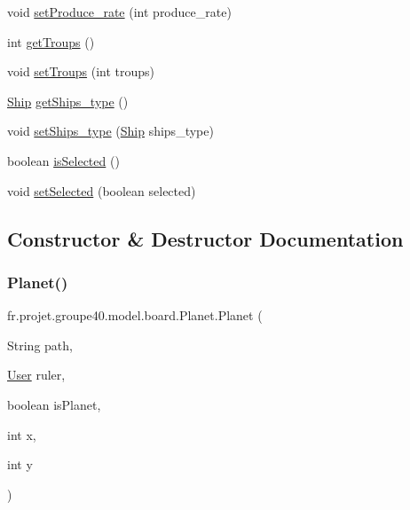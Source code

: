 \begin{DoxyCompactItemize}
\item 
void \hyperlink{classfr_1_1projet_1_1groupe40_1_1model_1_1board_1_1_planet_a6b556f628701ec94887fbe856bc3b609}{set\+Produce\+\_\+rate} (int produce\+\_\+rate)
\item 
int \hyperlink{classfr_1_1projet_1_1groupe40_1_1model_1_1board_1_1_planet_a0f02d5be191e9d4390b6fe128197242a}{get\+Troups} ()
\item 
void \hyperlink{classfr_1_1projet_1_1groupe40_1_1model_1_1board_1_1_planet_a2412d66ee3f606d0fce1a54e7675782e}{set\+Troups} (int troups)
\item 
\hyperlink{classfr_1_1projet_1_1groupe40_1_1model_1_1ships_1_1_ship}{Ship} \hyperlink{classfr_1_1projet_1_1groupe40_1_1model_1_1board_1_1_planet_aa4fb6530a1c24adfc94218411840a65a}{get\+Ships\+\_\+type} ()
\item 
void \hyperlink{classfr_1_1projet_1_1groupe40_1_1model_1_1board_1_1_planet_a3d96bcb39bd1e5b3ab175dd5dcbd6d1f}{set\+Ships\+\_\+type} (\hyperlink{classfr_1_1projet_1_1groupe40_1_1model_1_1ships_1_1_ship}{Ship} ships\+\_\+type)
\item 
boolean \hyperlink{classfr_1_1projet_1_1groupe40_1_1model_1_1board_1_1_planet_ace2894a752d167330eab0642eb429cd6}{is\+Selected} ()
\item 
void \hyperlink{classfr_1_1projet_1_1groupe40_1_1model_1_1board_1_1_planet_a83902887fd1e26cc74b75da893cf5d90}{set\+Selected} (boolean selected)
\end{DoxyCompactItemize}


\subsection{Constructor \& Destructor Documentation}
\mbox{\label{classfr_1_1projet_1_1groupe40_1_1model_1_1board_1_1_planet_a14689f4495bcea6d743ba108432ce1a8}} 
\subsubsection{\texorpdfstring{Planet()}{Planet()}}
{\footnotesize\ttfamily fr.\+projet.\+groupe40.\+model.\+board.\+Planet.\+Planet (\begin{DoxyParamCaption}\item[{String}]{path,  }\item[{\hyperlink{classfr_1_1projet_1_1groupe40_1_1client_1_1_user}{User}}]{ruler,  }\item[{boolean}]{is\+Planet,  }\item[{int}]{x,  }\item[{int}]{y }\end{DoxyParamCaption})}



